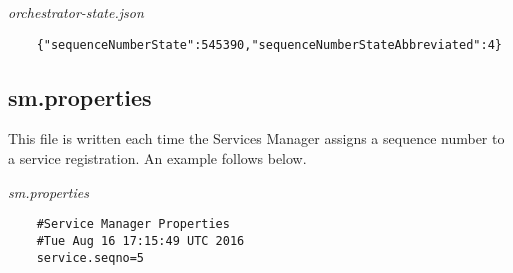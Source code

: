 	{\em orchestrator-state.json}
	\begin{verbatim}
	{"sequenceNumberState":545390,"sequenceNumberStateAbbreviated":4}
	\end{verbatim}
	
	\subsection{sm.properties}

	This file is written each time the {\DUCC} Services Manager assigns 
	a sequence number to a service registration.
	An example follows below.
	
	{\em sm.properties}
	\begin{verbatim}
	#Service Manager Properties
	#Tue Aug 16 17:15:49 UTC 2016
	service.seqno=5
	\end{verbatim}
	
